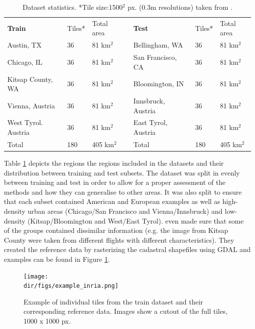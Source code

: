 \begin{table}[htbp]
\centering
\begin{adjustbox}{width=1\textwidth,center=\textwidth}
\begin{tabular}{l|llll|ll}
\textbf{Train}      & Tiles* & Total area &  & \textbf{Test}       & Tiles* & Total area \\ \cline{1-3} \cline{5-7} 
Austin, TX          & 36     & 81 km$^2$     &  & Bellingham, WA      & 36     & 81 km$^2$     \\
Chicago, IL         & 36     & 81 km$^2$     &  & San Francisco, CA   & 36     & 81 km$^2$     \\
Kitsap County, WA   & 36     & 81 km$^2$     &  & Bloomington, IN     & 36     & 81 km$^2$     \\
Vienna, Austria     & 36     & 81 km$^2$     &  & Innsbruck, Austria  & 36     & 81 km$^2$     \\
West Tyrol. Austria & 36     & 81 km$^2$     &  & East Tyrol, Austria & 36     & 81 km$^2$     \\
Total               & 180    & 405 km$^2$    &  & Total               & 180    & 405 km$^2$   
\end{tabular}
\end{adjustbox}
\caption[Dataset statistics.]{Dataset statistics. *Tile size:1500$^2$ px. (0.3m resolutions) taken from \cite{maggiori17a}.}
\label{tab.inria_dataset}
\end{table}

Table \ref{tab.inria_dataset} depicts the regions the regions included in the datasets and their distribution between training and test subsets. The dataset was split in evenly between training and test in order to allow for a proper assessment of the methods and how they can generalise to other areas. It was also split to ensure that each subset contained American and European examples as well as high-density urban areas (Chicago/San Francisco and Vienna/Innsbruck) and low-density (Kitsap/Bloomington and West/East Tyrol). \cite{maggiori17a} even made sure that some of the groups contained dissimilar information (e.g. the image from Kitsap County were taken from different flights with different characteristics). They created the reference data by rasterizing the cadastral shapefiles using GDAL and examples can be found in Figure \ref{fig.inria_dataset}.

\begin{figure}[htpb]
    \centering
    \texttt{[image: \\dir/figs/example\_inria.png]}
    \caption[Examples from the INRIA Image Labelling Dataset]{Example of individual tiles from the train dataset and their corresponding reference data. Images show a cutout of the full tiles, 1000 x 1000 px.}
    \label{fig.inria_dataset}
\end{figure}

